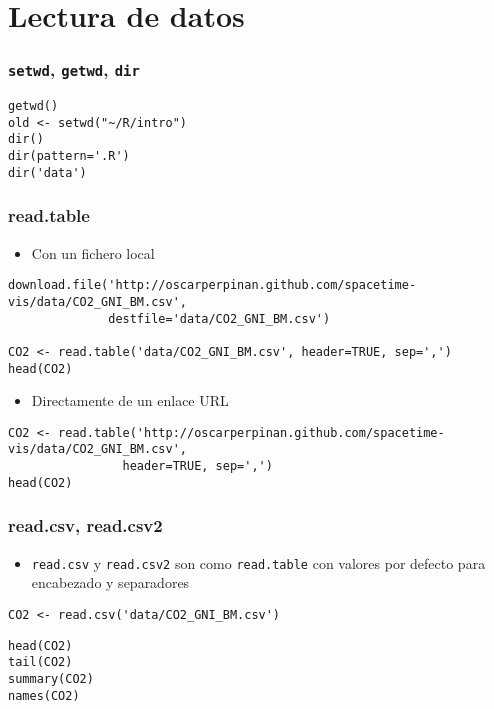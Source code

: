 \documentclass[xcolor={usenames,svgnames,dvipsnames}]{beamer}
\begin{document}
\section{Lectura de datos}
\label{sec-2}
\begin{frame}[fragile]
\frametitle{\texttt{setwd}, \texttt{getwd}, \texttt{dir}}
\label{sec-2-1}


\lstset{language=R}
\begin{lstlisting}
getwd()
old <- setwd("~/R/intro")
dir()
dir(pattern='.R')
dir('data')
\end{lstlisting}
\end{frame}
\begin{frame}[fragile]
\frametitle{read.table}
\label{sec-2-2}

\begin{itemize}
\item Con un fichero local
\end{itemize}

\lstset{language=R}
\begin{lstlisting}
download.file('http://oscarperpinan.github.com/spacetime-vis/data/CO2_GNI_BM.csv',
              destfile='data/CO2_GNI_BM.csv')

CO2 <- read.table('data/CO2_GNI_BM.csv', header=TRUE, sep=',')
head(CO2)
\end{lstlisting}
\begin{itemize}
\item Directamente de un enlace URL
\end{itemize}

\lstset{language=R}
\begin{lstlisting}
CO2 <- read.table('http://oscarperpinan.github.com/spacetime-vis/data/CO2_GNI_BM.csv',
                header=TRUE, sep=',')
head(CO2)
\end{lstlisting}
\end{frame}
\begin{frame}[fragile]
\frametitle{read.csv, read.csv2}
\label{sec-2-3}

\begin{itemize}
\item \texttt{read.csv} y \texttt{read.csv2} son como \texttt{read.table} con valores
  por defecto para encabezado y separadores
\end{itemize}


\lstset{language=R}
\begin{lstlisting}
CO2 <- read.csv('data/CO2_GNI_BM.csv')
\end{lstlisting}


\lstset{language=R}
\begin{lstlisting}
head(CO2)
tail(CO2)
summary(CO2)
names(CO2)
\end{lstlisting}
\end{frame}
\end{document}
